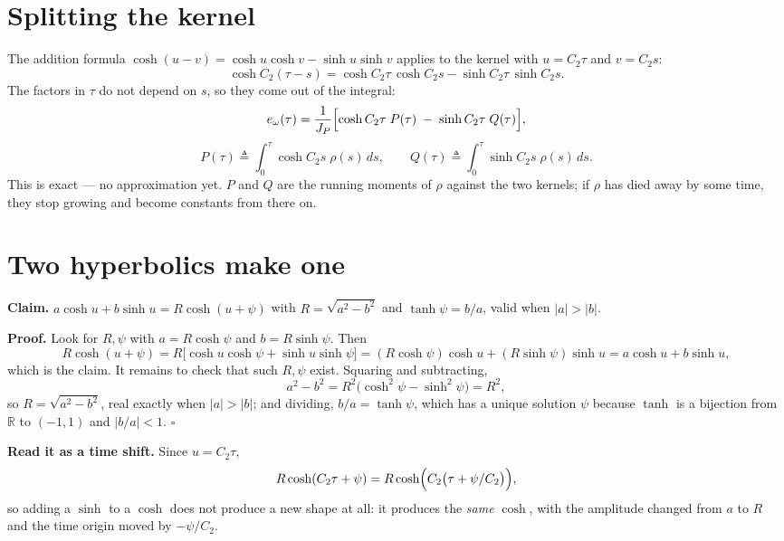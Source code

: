 \documentclass[11pt]{article}
\begin{document}
\section{Splitting the kernel}

The addition formula $\cosh(u-v) = \cosh u\cosh v - \sinh u\sinh v$
applies to the kernel with $u = C_2\tau$ and $v = C_2s$:
\[
  \cosh C_2(\tau-s) = \cosh C_2\tau\,\cosh C_2s
                    - \sinh C_2\tau\,\sinh C_2s .
\]
The factors in $\tau$ do not depend on $s$, so they come out of the
integral:
\begin{equation}
  e_\omega(\tau) = \frac{1}{J_P}
   \Bigl[\cosh C_2\tau\;P(\tau) \;-\; \sinh C_2\tau\;Q(\tau)\Bigr],
  \label{eq:PQ}
\end{equation}
\begin{equation}
  P(\tau) \triangleq \int_0^{\tau}\!\cosh C_2s\;\rho(s)\,ds,
  \qquad
  Q(\tau) \triangleq \int_0^{\tau}\!\sinh C_2s\;\rho(s)\,ds .
\end{equation}
This is exact --- no approximation yet. $P$ and $Q$ are the running
moments of $\rho$ against the two kernels; if $\rho$ has died away by
some time, they stop growing and become constants from there on.

\section{Two hyperbolics make one}

\textbf{Claim.}
$\displaystyle a\cosh u + b\sinh u = R\cosh(u+\psi)$ with
$R = \sqrt{a^2-b^2}$ and $\tanh\psi = b/a$, valid when $|a| > |b|$.

\textbf{Proof.} Look for $R,\psi$ with $a = R\cosh\psi$ and
$b = R\sinh\psi$. Then
\[
  R\cosh(u+\psi)
   = R\bigl[\cosh u\cosh\psi + \sinh u\sinh\psi\bigr]
   = (R\cosh\psi)\cosh u + (R\sinh\psi)\sinh u
   = a\cosh u + b\sinh u ,
\]
which is the claim. It remains to check that such $R,\psi$ exist.
Squaring and subtracting,
\[
  a^2 - b^2 = R^2\bigl(\cosh^2\psi - \sinh^2\psi\bigr) = R^2 ,
\]
so $R = \sqrt{a^2-b^2}$, real exactly when $|a|>|b|$; and dividing,
$b/a = \tanh\psi$, which has a unique solution $\psi$ because $\tanh$
is a bijection from $\mathbb{R}$ to $(-1,1)$ and $|b/a| < 1$. \hfill$\square$

\textbf{Read it as a time shift.} Since $u = C_2\tau$,
\[
  R\cosh(C_2\tau + \psi) = R\cosh\Bigl(C_2\bigl(\tau + \psi/C_2\bigr)\Bigr),
\]
so adding a $\sinh$ to a $\cosh$ does not produce a new shape at all: it
produces the \emph{same} $\cosh$, with the amplitude changed from $a$ to
$R$ and the time origin moved by $-\psi/C_2$.
\end{document}

